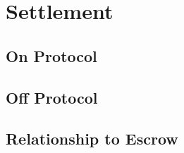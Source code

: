 \chapter{Settlement}

\section{On Protocol}

\section{Off Protocol}

\section{Relationship to Escrow}
